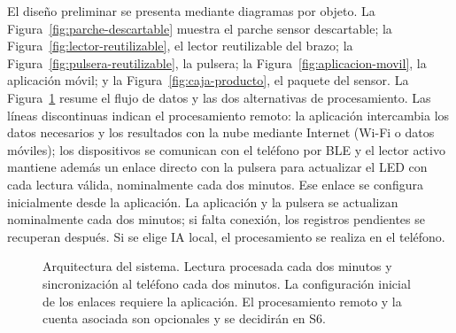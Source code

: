 El diseño preliminar se presenta mediante diagramas por objeto.
La Figura~\ref{fig:parche-descartable} muestra el parche sensor
 descartable; la Figura~\ref{fig:lector-reutilizable}, el lector
reutilizable del brazo; la Figura~\ref{fig:pulsera-reutilizable},
la pulsera; la Figura~\ref{fig:aplicacion-movil}, la aplicación
móvil; y la Figura~\ref{fig:caja-producto}, el paquete del sensor.
La Figura~\ref{fig:arquitectura-sistema} resume el flujo de datos y las dos alternativas de procesamiento. Las líneas discontinuas indican el procesamiento remoto: la aplicación intercambia los datos necesarios y los resultados con la nube mediante Internet (Wi-Fi o datos móviles); los dispositivos se comunican con el teléfono por BLE y el lector activo mantiene además un enlace directo con la pulsera para actualizar el LED con cada lectura válida, nominalmente cada dos minutos. Ese enlace se configura inicialmente desde la aplicación. La aplicación y la pulsera se actualizan nominalmente cada dos minutos; si falta conexión, los registros pendientes se recuperan después. Si se elige IA local, el procesamiento se realiza en el teléfono.



\begin{figure}[H]
\centering
{}
\caption{Arquitectura del sistema. Lectura procesada cada dos minutos y sincronización al teléfono cada dos minutos. La configuración inicial de los enlaces requiere la aplicación. El procesamiento remoto y la cuenta asociada son opcionales y se decidirán en S6.}
\label{fig:arquitectura-sistema}
\end{figure}







